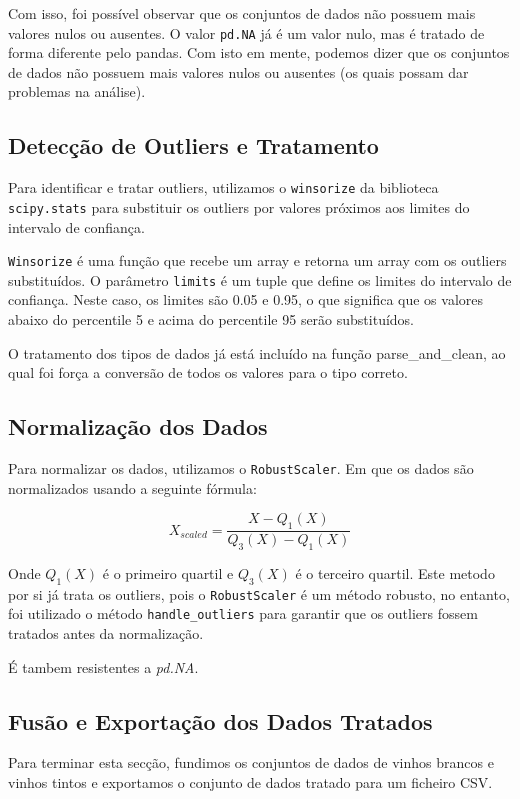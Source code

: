 \documentclass{article}
\begin{document}
Com isso, foi possível observar que os conjuntos de dados não possuem mais valores nulos ou ausentes. O valor \texttt{pd.NA} já é um valor nulo, mas é tratado de forma diferente pelo pandas. Com isto em mente, podemos dizer que os conjuntos de dados não possuem mais valores nulos ou ausentes (os quais possam dar problemas na análise).

\subsection{Detecção de Outliers e Tratamento}
Para identificar e tratar outliers, utilizamos o \texttt{winsorize} da biblioteca \texttt{scipy.stats} para substituir os outliers por valores próximos aos limites do intervalo de confiança.

\texttt{Winsorize} é uma função que recebe um array e retorna um array com os outliers substituídos. O parâmetro \texttt{limits} é um tuple que define os limites do intervalo de confiança. Neste caso, os limites são 0.05 e 0.95, o que significa que os valores abaixo do percentile 5 e acima do percentile 95 serão substituídos.

O tratamento dos tipos de dados já está incluído na função parse_and_clean, ao qual foi força a conversão de todos os valores para o tipo correto.

\subsection{Normalização dos Dados}
Para normalizar os dados, utilizamos o \texttt{RobustScaler}. Em que os dados são normalizados usando a seguinte fórmula:

\begin{equation}
  X_{scaled} = \frac{X - Q_1(X)}{Q_3(X) - Q_1(X)}
\end{equation}

Onde $Q_1(X)$ é o primeiro quartil e $Q_3(X)$ é o terceiro quartil.
Este metodo por si já trata os outliers, pois o \texttt{RobustScaler} é um método robusto, no entanto, foi utilizado o método \texttt{handle\_outliers} para garantir que os outliers fossem tratados antes da normalização.

É tambem resistentes a \textit{pd.NA}.

\subsection{Fusão e Exportação dos Dados Tratados}
Para terminar esta secção, fundimos os conjuntos de dados de vinhos brancos e vinhos tintos e exportamos o conjunto de dados tratado para um ficheiro CSV.
\end{document}
